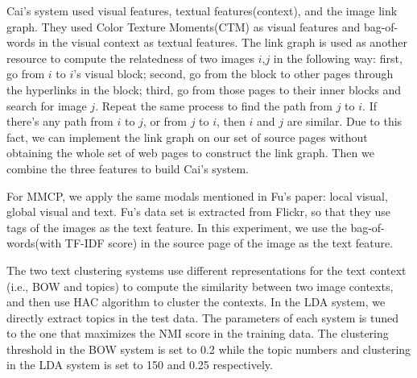 

Cai's system used visual features, textual features(context), and the image link graph.
They used Color Texture Moments(CTM)\cite{Yu03colortexture} as visual features and bag-of-words in the visual context
as textual features.
The link graph is used as another resource to compute the relatedness of
two images $i$,$j$ in the following way: first, go from $i$ to $i$'s visual
block; second, go from the block to other pages through the hyperlinks in
the block; third, go from those pages to their inner blocks and search
for image $j$. Repeat the same process to find the
path from $j$ to $i$. If there's any path from $i$ to $j$,
or from $j$ to $i$, then $i$ and $j$ are
similar. Due to this fact, we can implement the link graph on our
set of source pages without obtaining the whole set of web pages to
construct the link graph. Then we combine the three features to
build Cai's system.

For MMCP, we apply the same modals mentioned in Fu's paper:
local visual, global visual and text.
Fu's data set is extracted from Flickr, so that they use tags of
the images as the text feature. In this experiment,
we use the bag-of-words(with TF-IDF score)
in the source page of the image as the text feature.

The two text clustering systems use different representations for the text
context (i.e., BOW and topics)
to compute the similarity between two image contexts, and then use
HAC algorithm to cluster the contexts.
In the LDA system, we directly extract topics in the test data.
The parameters of each system is tuned to the one that maximizes
the NMI score in the training data. The clustering threshold in the
BOW system is set to 0.2 while the topic numbers and clustering in the
LDA system is set to 150 and 0.25 respectively.

